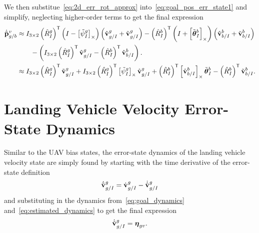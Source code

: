 We then substitue~\eqref{eq:2d_err_rot_approx}
into~\eqref{eq:goal_pos_err_state1} and simplify, neglecting higher-order terms
to get the final expression
\begin{align}
  \dot{\tilde{\boldsymbol{\mathrm{p}}}}_{g/b}^{v}
  &\approx
  I_{3 \times 2} \left( \hat{R}_{I}^{g} \right)^{\mathsf{T}}
  \left( I - \left[ \tilde{\psi}_I^g \right]_{\times} \right)
  \left( \hat{\boldsymbol{\mathrm{v}}}_{g/I}^{g} + \tilde{\boldsymbol{\mathrm{v}}}_{g/I}^{g} \right)
  - \left( \hat{R}_{I}^{b} \right)^{\mathsf{T}}
  \left( I + \left[ \tilde{\boldsymbol{\mathrm{\theta}}}_I^b \right]_{\times} \right)
  \left( \hat{\boldsymbol{\mathrm{v}}}_{b/I}^{b} + \tilde{\boldsymbol{\mathrm{v}}}_{b/I}^{b} \right) \\
  & \qquad -
  \left(
  I_{3 \times 2} \left( \hat{R}_{I}^{g} \right)^{\mathsf{T}}
  \hat{\boldsymbol{\mathrm{v}}}_{g/I}^{g} - \left( \hat{R}_{I}^{b} \right)^{\mathsf{T}}
  \hat{\boldsymbol{\mathrm{v}}}_{b/I}^{b}
  \right). \nonumber \\
  &\approx
  I_{3 \times 2} \left( \hat{R}_{I}^{g} \right)^{\mathsf{T}}
  \tilde{\boldsymbol{\mathrm{v}}}_{g/I}^g
  +
  I_{3 \times 2} \left( \hat{R}_{I}^{g} \right)^{\mathsf{T}}
  \left[  \tilde{\psi}_I^g  \right]_{\times} \hat{\boldsymbol{\mathrm{v}}}_{g/I}^g
  +
  \left( \hat{R}_{I}^{b} \right)^{\mathsf{T}} \left[  \hat{\boldsymbol{\mathrm{v}}}_{b/I}^{b}  \right]_{\times} 
  \tilde{\boldsymbol{\mathrm{\theta}}}_I^b
  -
  \left( \hat{R}_{I}^{b} \right)^{\mathsf{T}} \tilde{\boldsymbol{\mathrm{v}}}_{b/I}^{b} .
\end{align}

\section{Landing Vehicle Velocity Error-State Dynamics}
Similar to the UAV bias states, the error-state dynamics of the landing vehicle
velocity state are simply found by starting with the time derivative of the
error-state definition
\begin{equation}
  \dot{\tilde{\boldsymbol{\mathrm{v}}}}_{g/I}^g = \dot{\boldsymbol{\mathrm{v}}}_{g/I}^g -
  \dot{\hat{\boldsymbol{\mathrm{v}}}}_{g/I}^g
\end{equation}
and substituting in the dynamics from~\eqref{eq:goal_dynamics}
and~\eqref{eq:estimated_dynamics} to get the final expression
\begin{equation}
  \dot{\tilde{\boldsymbol{\mathrm{v}}}}_{g/I}^g = \boldsymbol{\mathrm{\eta}}_{gv}.
\end{equation}

